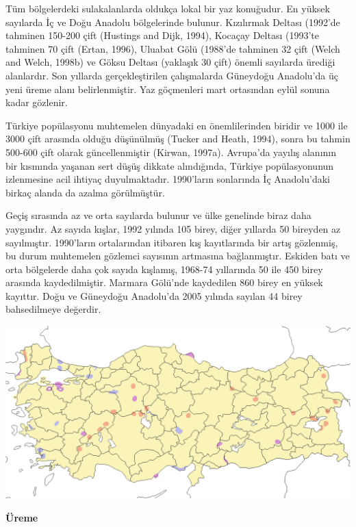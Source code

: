 \documentclass[
  a4paper,
  DIV=11,
  numbers=noendperiod]{scrartcl}
\begin{document}
Tüm bölgelerdeki sulakalanlarda oldukça lokal bir yaz konuğudur. En
yüksek sayılarda İç ve Doğu Anadolu bölgelerinde bulunur. Kızılırmak
Deltası (1992'de tahminen 150-200 çift (Hustings and Dijk, 1994),
Kocaçay Deltası (1993'te tahminen 70 çift (Ertan, 1996), Uluabat Gölü
(1988'de tahminen 32 çift (Welch and Welch, 1998b) ve Göksu Deltası
(yaklaşık 30 çift) önemli sayılarda ürediği alanlardır. Son yıllarda
gerçekleştirilen çalışmalarda Güneydoğu Anadolu'da üç yeni üreme alanı
belirlenmiştir. Yaz göçmenleri mart ortasından eylül sonuna kadar
gözlenir.

Türkiye popülasyonu muhtemelen dünyadaki en önemlilerinden biridir ve
1000 ile 3000 çift arasında olduğu düşünülmüş (Tucker and Heath, 1994),
sonra bu tahmin 500-600 çift olarak güncellenmiştir (Kirwan, 1997a).
Avrupa'da yayılış alanının bir kısmında yaşanan sert düşüş dikkate
alındığında, Türkiye popülasyonunun izlenmesine acil ihtiyaç
duyulmaktadır. 1990'ların sonlarında İç Anadolu'daki birkaç alanda da
azalma görülmüştür.

Geçiş sırasında az ve orta sayılarda bulunur ve ülke genelinde biraz
daha yaygındır. Az sayıda kışlar, 1992 yılında 105 birey, diğer yıllarda
50 bireyden az sayılmıştır. 1990'ların ortalarından itibaren kış
kayıtlarında bir artış gözlenmiş, bu durum muhtemelen gözlemci sayısının
artmasına bağlanmıştır. Eskiden batı ve orta bölgelerde daha çok sayıda
kışlamış, 1968-74 yıllarında 50 ile 450 birey arasında kaydedilmiştir.
Marmara Gölü'nde kaydedilen 860 birey en yüksek kayıttır. Doğu ve
Güneydoğu Anadolu'da 2005 yılında sayılan 44 birey bahsedilmeye
değerdir.

\includegraphics{images/harita_Aythya nyroca.png}

\textbf{Üreme}
\end{document}
